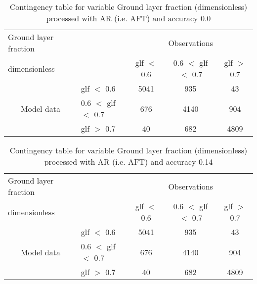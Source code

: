 \documentclass[11pt,english]{article}
\begin{document}
\begin{table}[]
\begin{center}
\begin{tabular}{llccc}
\hline
{Ground layer fraction}                                       &                                                    & \multicolumn{3}{c}{Observations}                 \\
{dimensionless}                                       &                             & glf $<$ 0.6   & 0.6 $<$ glf $<$ 0.7 & glf $>$ 0.7 \\
\hline
\multicolumn{1}{c}{\multirow{3}{*}{Model data}}  & glf $<$ 0.6             & 5041                & 935                       & 43              \\
                                                 & 0.6  $<$ glf $<$ 0.7 & 676                & 4140                       & 904              \\
                                                 & glf $>$ 0.7             & 40                & 682                       & 4809              \\
\hline
\end{tabular}
\end{center}
\caption{Contingency table for variable Ground layer fraction (dimensionless) processed with AR (i.e. AFT) and accuracy 0.0}
\label{tab:contingencyglfAFT}
\end{table}
\begin{table}[]
\begin{center}
\begin{tabular}{llccc}
\hline
{Ground layer fraction}                                       &                                                    & \multicolumn{3}{c}{Observations}                 \\
{dimensionless}                                       &                             & glf $<$ 0.6   & 0.6 $<$ glf $<$ 0.7 & glf $>$ 0.7 \\
\hline
\multicolumn{1}{c}{\multirow{3}{*}{Model data}}  & glf $<$ 0.6             & 5041                & 935                       & 43              \\
                                                 & 0.6  $<$ glf $<$ 0.7 & 676                & 4140                       & 904              \\
                                                 & glf $>$ 0.7             & 40                & 682                       & 4809              \\
\hline
\end{tabular}
\end{center}
\caption{Contingency table for variable Ground layer fraction (dimensionless) processed with AR (i.e. AFT) and accuracy 0.14}
\label{tab:contingencyglfAFT}
\end{table}
\clearpage
\end{document}

